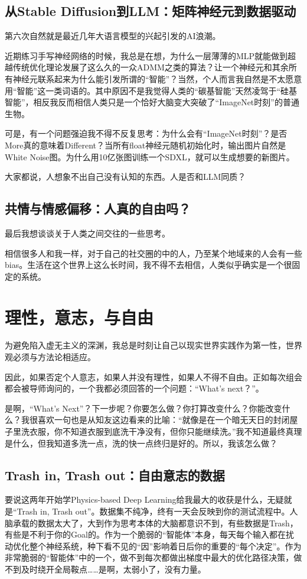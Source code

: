 \documentclass[11pt,twoside,fontset=none,scheme=plain]{ctexart}
\begin{document}
    \subsection{从Stable Diffusion到LLM：矩阵神经元到数据驱动}
    第六次自然就是最近几年大语言模型的兴起引发的AI浪潮。

    近期练习手写神经网络的时候，我总是在想，为什么一层薄薄的MLP就能做到超越传统优化理论发展了这么久的一众ADMM之类的算法？让一个神经元和其余所有神经元联系起来为什么能引发所谓的“智能”？当然，个人而言我自然是不太愿意用“智能”这一类词语的。其中原因不是我觉得人类的“碳基智能”天然凌驾于“硅基智能”，相反我反而相信人类只是一个恰好大脑变大突破了“ImageNet时刻”的普通生物。

    可是，有一个问题强迫我不得不反复思考：为什么会有“ImageNet时刻”？是否More真的意味着Different？当所有float神经元随机初始化时，输出图片自然是White Noise图。为什么用10亿张图训练一个SDXL，就可以生成想要的新图片。

    大家都说，人想象不出自己没有认知的东西。人是否和LLM同质？

    \subsection{共情与情感偏移：人真的自由吗？}
    最后我想谈谈关于人类之间交往的一些思考。

    相信很多人和我一样，对于自己的社交圈的中的人，乃至某个地域来的人会有一些bias。生活在这个世界上这么长时间，我不得不去相信，人类似乎确实是一个很固定的系统。


    \section{理性，意志，与自由}

    为避免陷入虚无主义的深渊，我总是时刻让自己以现实世界实践作为第一性，世界观必须与方法论相适应。

    因此，如果否定个人意志，如果人并没有理性，如果人不得不自由。正如每次组会都会被导师询问的，一个我都必须回答的一个问题：“What's next？”。

    是啊，“What's Next”？下一步呢？你要怎么做？你打算改变什么？你能改变什么？我很喜欢一句也是从知友这边看来的比喻：“就像是在一个暗无天日的封闭屋子里洗衣服，你不知道衣服到底洗干净没有，但你只能继续洗。”我不知道最终真理是什么，但我知道多洗一点，洗的快一点终归是好的。所以，我该怎么做？

    \subsection{Trash in, Trash out：自由意志的数据}
    要说这两年开始学Physics-based Deep Learning给我最大的收获是什么，无疑就是“Trash in, Trash out”。数据集不纯净，终有一天会反映到你的测试流程中。人脑承载的数据太大了，大到作为思考本体的大脑都意识不到，有些数据是Trash，有些是不利于你的Goal的。作为一个脆弱的“智能体”本身，每天每个输入都在扰动优化整个神经系统，种下看不见的“因”影响着日后你的重要的“每个决定”。作为非常脆弱的“智能体”中的一个，做不到每次都做出梯度中最大的优化路径决策，做不到及时绕开全局鞍点……是啊，太弱小了，没有力量。
\end{document}
